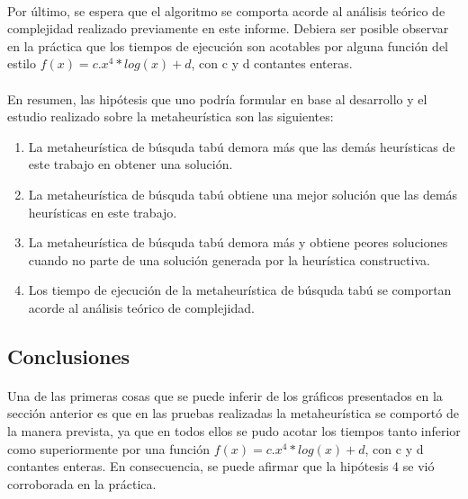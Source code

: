 \paragraph{}
Por último, se espera que el algoritmo se comporta acorde al análisis teórico de complejidad realizado previamente en este informe. Debiera ser posible observar en la práctica que los tiempos de ejecución son acotables por alguna función del estilo $f(x) = c.x^4 * log(x) + d$, con c y d contantes enteras.

\paragraph{}
En resumen, las hipótesis que uno podría formular en base al desarrollo y el estudio realizado sobre la metaheurística son las siguientes:
\begin{enumerate}
	\item La metaheurística de búsquda tabú demora más que las demás heurísticas de este trabajo en obtener una solución.
	\item La metaheurística de búsquda tabú obtiene una mejor solución que las demás heurísticas en este trabajo.
	\item La metaheurística de búsquda tabú demora más y obtiene peores soluciones cuando no parte de una solución generada por la heurística constructiva.
	\item Los tiempo de ejecución de la metaheurística de búsquda tabú se comportan acorde al análisis teórico de complejidad.
\end{enumerate}

\subsection{Conclusiones}
\paragraph{}
Una de las primeras cosas que se puede inferir de los gráficos presentados en la sección anterior es que en las pruebas realizadas la metaheurística se comportó de la manera prevista, ya que en todos ellos se pudo acotar los tiempos tanto inferior como superiormente por una función $f(x) = c.x^4 * log(x) + d$, con c y d contantes enteras. En consecuencia, se puede afirmar que la hipótesis 4 se vió corroborada en la práctica.

